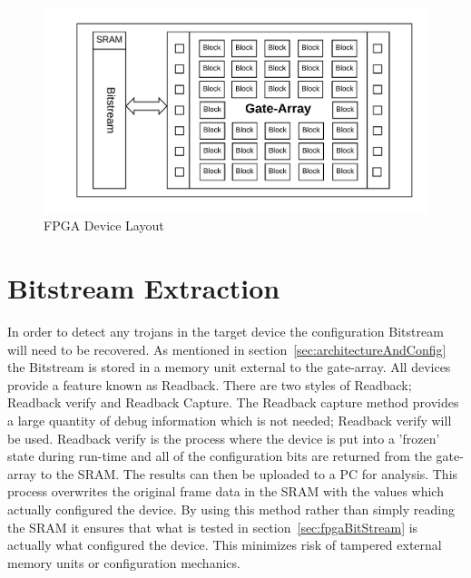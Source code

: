 \begin{figure}
\centering
\includegraphics[width=0.9\linewidth]{Figures/architecture}
\caption[FPGA Device Layout]{FPGA Device Layout}
\label{fig:architecture}
\end{figure}


\section{\gls{Bitstream} Extraction} \label{sec:bitstreamExtraction}
In order to detect any trojans in the \gls{target} device the configuration \gls{Bitstream} will need to be recovered.
As mentioned in section~\ref{sec:architectureAndConfig} the \gls{Bitstream} is stored in a memory unit external to the gate-array.
All \Xilinx devices provide a feature known as \gls{Readback}.
There are two styles of \gls{Readback}; \gls{Readback} verify and \gls{Readback} Capture.
The \gls{Readback} capture method provides a large quantity of debug information which is not needed; \gls{Readback} verify will be used.
\gls{Readback} verify is the process where the device is put into a 'frozen' state during run-time and all of the configuration bits are returned from the gate-array to the \acrshort{SRAM}. 
The results can then be uploaded to a \acrfull{PC} for analysis.
This process overwrites the original frame data in the \acrshort{SRAM} with the values which actually configured the device. 
By using this method rather than simply reading the \acrshort{SRAM} it ensures that what is tested in section~\ref{sec:fpgaBitStream} is actually what configured the device.
This minimizes risk of tampered external memory units or configuration mechanics. 


